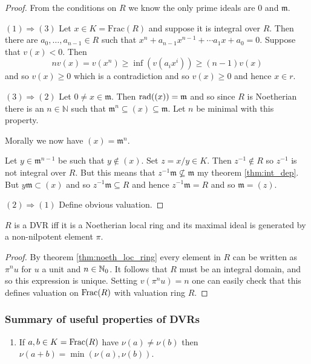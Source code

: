 \documentclass{memoir}
\begin{document}
\begin{proof}
    From the conditions on $R$ we know the only prime ideals are $0$ and $\mathfrak m$.

    $(1)\Rightarrow (3)$ Let $x\in K = \text{Frac}(R)$ and suppose it is integral over $R$.
    Then there are $a_0,\dots,a_{n-1}\in R$ such that $x^n+a_{n-1}x^{n-1}+\cdots a_1x+a_0 = 0$.
    Suppose that $v(x)<0$. Then 
    \begin{equation}
        nv(x) = v(x^n) \ge \inf(v(a_ix^i)) \ge (n-1)v(x)
    \end{equation}
    and so $v(x)\ge0$ which is a contradiction and so $v(x)\ge0$ and hence $x\in r$.

    $(3)\Rightarrow (2)$ Let $0\ne x\in \mathfrak m$. Then $\text{rad}((x)) = \mathfrak m$ and so since $R$ is Noetherian there is an $n\in \mathbb N$ such that $\mathfrak m^n\subseteq (x) \subseteq \mathfrak m$. Let $n$ be minimal with this property. 
    \begin{remark}
        Morally we now have $(x) = \mathfrak m^n$.
    \end{remark}
    Let $y \in \mathfrak m^{n-1}$ be such that $y\not\in (x)$.
    Set $z = x/y\in K$.
    Then $z^{-1}\not\in R$ so $z^{-1}$ is not integral over $R$.
    But this means that $z^{-1}\mathfrak m\nsubseteq \mathfrak m$ my theorem \ref{thm:int_dep}.
    But $y\mathfrak m\subset (x)$ and so $z^{-1}\mathfrak m\subseteq R$ and hence $z^{-1}\mathfrak m = R$  and so $\mathfrak m = (z)$.

    $(2)\Rightarrow (1)$ Define obvious valuation. 
\end{proof}
\begin{proposition}
    $R$ is a DVR iff it is a Noetherian local ring and its maximal ideal is generated by a non-nilpotent element $\pi$.
\end{proposition}
\begin{proof}
    By theorem \ref{thm:noeth_loc_ring} every element in $R$ can be written as $\pi^nu$ for $u$ a unit and $n\in \mathbb{N}_0$.
    It follows that $R$ must be an integral domain, and so this expression is unique.
    Setting $v(\pi^nu) = n$ one can easily check that this defines valuation on $\text{Frac}(R)$ with valuation ring $R$.
\end{proof}
\subsubsection{Summary of useful properties of DVRs}
\begin{enumerate}
    \item If $a,b\in K = \text{Frac}(R)$ have $\nu(a) \ne \nu (b)$ then $\nu(a+b) = \min(\nu(a),\nu(b))$.
\end{enumerate}
\end{document}
